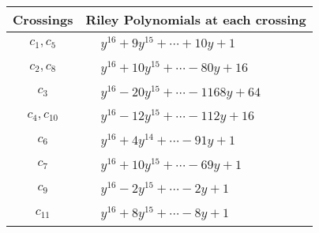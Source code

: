 \documentclass[1p]{elsarticle_modified}
\theoremstyle{definition}
\begin{document}
\begin{tabular}{m{50pt}|m{274pt}}
Crossings & \hspace{64pt}Riley Polynomials at each crossing \\
\hline $$\begin{aligned}c_{1},c_{5}\end{aligned}$$&$\begin{aligned}
&y^{16}+9 y^{15}+\cdots+10 y+1
\end{aligned}$\\
\hline $$\begin{aligned}c_{2},c_{8}\end{aligned}$$&$\begin{aligned}
&y^{16}+10 y^{15}+\cdots-80 y+16
\end{aligned}$\\
\hline $$\begin{aligned}c_{3}\end{aligned}$$&$\begin{aligned}
&y^{16}-20 y^{15}+\cdots-1168 y+64
\end{aligned}$\\
\hline $$\begin{aligned}c_{4},c_{10}\end{aligned}$$&$\begin{aligned}
&y^{16}-12 y^{15}+\cdots-112 y+16
\end{aligned}$\\
\hline $$\begin{aligned}c_{6}\end{aligned}$$&$\begin{aligned}
&y^{16}+4 y^{14}+\cdots-91 y+1
\end{aligned}$\\
\hline $$\begin{aligned}c_{7}\end{aligned}$$&$\begin{aligned}
&y^{16}+10 y^{15}+\cdots-69 y+1
\end{aligned}$\\
\hline $$\begin{aligned}c_{9}\end{aligned}$$&$\begin{aligned}
&y^{16}-2 y^{15}+\cdots-2 y+1
\end{aligned}$\\
\hline $$\begin{aligned}c_{11}\end{aligned}$$&$\begin{aligned}
&y^{16}+8 y^{15}+\cdots-8 y+1
\end{aligned}$\\
\hline
\end{tabular}\\~\\
\end{document}
